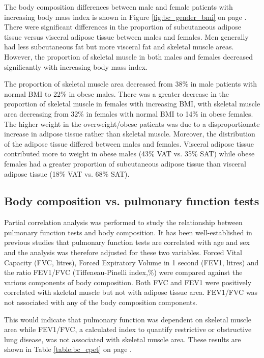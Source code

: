 The body composition differences between male and female patients with increasing body mass index is shown in Figure \ref{fig:bc_gender_bmi} on page \pageref{fig:bc_gender_bmi}. 
There were significant differences in the proportion of subcutaneous adipose tissue versus visceral adipose tissue between males and females. 
Men generally had less subcutaneous fat but more visceral fat and skeletal muscle areas. 
However, the proportion of skeletal muscle in both males and females decreased significantly with increasing body mass index.

The proportion of skeletal muscle area decreased from 38\% in male patients with normal BMI to 22\% in obese males. 
There was a greater decrease in the proportion of skeletal muscle in females with increasing BMI, with skeletal muscle area decreasing from 32\% in females with normal BMI to 14\% in obese females. 
The higher weight in the overweight/obese patients was due to a disproportionate increase in adipose tissue rather than skeletal muscle. 
Moreover, the distribution of the adipose tissue differed between males and females.
Visceral adipose tissue contributed more to weight in obese males (43\% VAT vs. 35\% SAT) while obese females had a greater proportion of subcutaneous adipose tissue than visceral adipose tissue (18\% VAT vs. 68\% SAT).


\subsection{Body composition vs. pulmonary function tests}

Partial correlation analysis was performed to study the relationship between pulmonary function tests and body composition. 
It has been well-established in previous studies that pulmonary function tests are correlated with age and sex and the analysis was therefore adjusted for these two variables. 
Forced Vital Capacity (FVC, litres), Forced Expiratory Volume in 1 second (FEV1, litres) and the ratio FEV1/FVC (Tiffeneau-Pinelli index,\%) were compared against the various components of body composition. 
Both FVC and FEV1 were positively correlated with skeletal muscle but not with adipose tissue area. 
FEV1/FVC was not associated with any of the body composition components. 

This would indicate that pulmonary function was dependent on skeletal muscle area while FEV1/FVC, a calculated index to quantify restrictive or obstructive lung disease, was not associated with skeletal muscle area. 
These results are shown in Table \ref{table:bc_cpet} on page \pageref{table:bc_cpet}.

